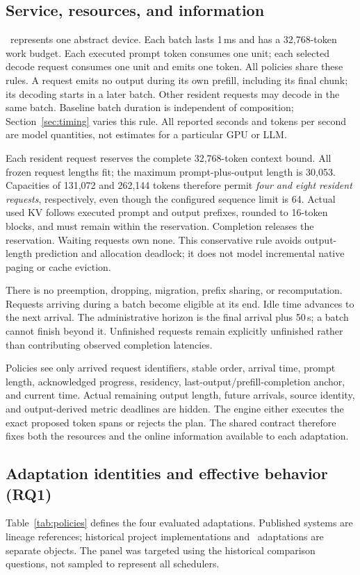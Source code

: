 \subsection{Service, resources, and information}
\cm\ represents one abstract device. Each batch lasts 1\,ms and has a
32,768-token work budget. Each executed prompt token consumes one unit;
each selected decode request consumes one unit and emits one token.
All policies share these rules. A request emits no output during its own
prefill, including its final chunk; its decoding starts in a later batch.
Other resident requests may decode in the same batch. Baseline batch duration
is independent of composition; Section~\ref{sec:timing} varies this rule.
All reported seconds and tokens per second are model quantities, not
estimates for a particular GPU or LLM.

Each resident request reserves the complete 32,768-token context bound.
All frozen request lengths fit; the maximum prompt-plus-output length is
30,053. Capacities of 131,072 and 262,144 tokens therefore permit
\emph{four and eight resident requests}, respectively, even though the
configured sequence limit is 64. Actual used KV follows executed prompt
and output prefixes, rounded to 16-token blocks, and must remain within
the reservation. Completion releases the reservation. Waiting requests own
none. This conservative rule avoids output-length prediction and allocation
deadlock; it does not model incremental native paging or cache eviction.

There is no preemption, dropping, migration, prefix sharing, or recomputation.
Requests arriving during a batch become eligible at its end. Idle time
advances to the next arrival. The administrative horizon is the final
arrival plus 50\,s; a batch cannot finish beyond it. Unfinished requests
remain explicitly unfinished rather than contributing observed completion
latencies.

Policies see only arrived request identifiers, stable order, arrival time,
prompt length, acknowledged progress, residency, last-output/prefill-completion
anchor, and current time. Actual remaining output length, future arrivals,
source identity, and output-derived metric deadlines are hidden. The engine
either executes the exact proposed token spans or rejects the plan. The
shared contract therefore fixes both the resources and the online
information available to each adaptation.

\subsection{Adaptation identities and effective behavior (RQ1)}
Table~\ref{tab:policies} defines the four evaluated adaptations. Published
systems are lineage references; historical project implementations and
\cm\ adaptations are separate objects. The panel was targeted using the
historical comparison questions, not sampled to represent all schedulers.

